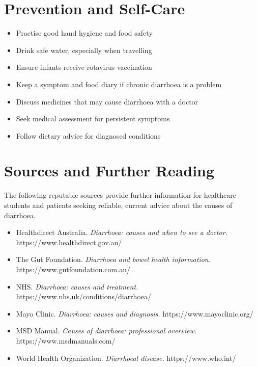 \section*{Prevention and Self-Care}
\begin{itemize}
    \item Practise good hand hygiene and food safety
    \item Drink safe water, especially when travelling
    \item Ensure infants receive rotavirus vaccination
    \item Keep a symptom and food diary if chronic diarrhoea is a problem
    \item Discuss medicines that may cause diarrhoea with a doctor
    \item Seek medical assessment for persistent symptoms
    \item Follow dietary advice for diagnosed conditions
\end{itemize}

\section*{Sources and Further Reading}
The following reputable sources provide further information for healthcare students and patients seeking reliable, current advice about the causes of diarrhoea.

\begin{itemize}
    \item Healthdirect Australia. \textit{Diarrhoea: causes and when to see a doctor.} https://www.healthdirect.gov.au/
    \item The Gut Foundation. \textit{Diarrhoea and bowel health information.} https://www.gutfoundation.com.au/
    \item NHS. \textit{Diarrhoea: causes and treatment.} https://www.nhs.uk/conditions/diarrhoea/
    \item Mayo Clinic. \textit{Diarrhoea: causes and diagnosis.} https://www.mayoclinic.org/
    \item MSD Manual. \textit{Causes of diarrhoea: professional overview.} https://www.msdmanuals.com/
    \item World Health Organization. \textit{Diarrhoeal disease.} https://www.who.int/
\end{itemize}
